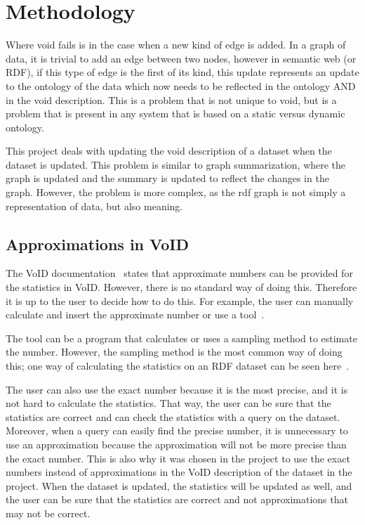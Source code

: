 \section{Methodology}\label{sec:methodology}


Where \gls{void} fails is in the case when a new kind of edge is added. In a graph of data, it is trivial to add an edge between two nodes, however in semantic web (or RDF), if this type of edge is the first of its kind, this update represents an update to the ontology of the data which now needs to be reflected in the ontology AND in the \gls{void} description. This is a problem that is not unique to \gls{void}, but is a problem that is present in any system that is based on a static versus dynamic ontology.


This project deals with updating the \gls{void} description of a dataset when the dataset is updated. This problem is similar to graph summarization, where the graph is updated and the summary is updated to reflect the changes in the graph. However, the problem is more complex, as the \gls{rdf} graph is not simply a representation of data, but also meaning.

\subsection{Approximations in VoID} \label{sec:approximations}
The VoID documentation~\cite{documentation-void} states that approximate numbers can be provided for the statistics in VoID.
However, there is no standard way of doing this. Therefore it is up to the user to decide how to do this. For example, the user can manually calculate and insert the approximate number or use a tool~\cite{the-web-of-data}.

The tool can be a program that calculates or uses a sampling method to estimate the number. However, the sampling method is the most common way of doing this; one way of calculating the statistics on an RDF dataset can be seen here~\cite{zneika2016rdf}.

The user can also use the exact number because it is the most precise, and it is not hard to calculate the statistics. That way, the user can be sure that the statistics are correct and can check the statistics with a query on the dataset. Moreover, when a query can easily find the precise number, it is unnecessary to use an approximation because the approximation will not be more precise than the exact number.
This is also why it was chosen in the project to use the exact numbers instead of approximations in the  VoID description of the dataset in the project. When the dataset is updated, the statistics will be updated as well, and the user can be sure that the statistics are correct and not approximations that may not be correct.

